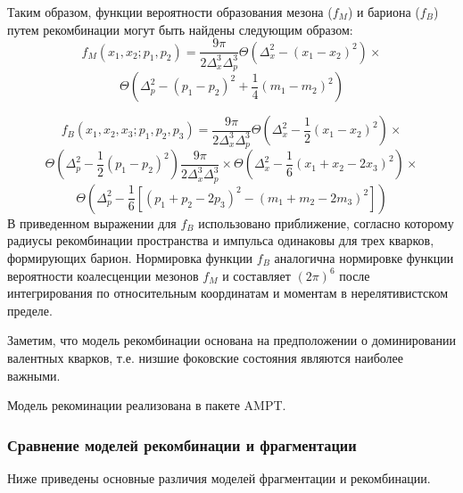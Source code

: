 Таким образом, функции вероятности образования мезона ($f_M$) и бариона ($f_B$) путем рекомбинации могут быть найдены следующим образом:
$$f_M (x_1,x_2;p_1,p_2 )=\frac{9 \pi}{2\Delta_{x}^3 \Delta_{p}^3} \Theta \left( \Delta_{x}^2 - (x_1 - x_2)^2  \right) \times$$
$$ \Theta \left( \Delta_{p}^2 - (p_1 - p_2)^2  + \frac{1}{4}(m_1 - m_2)^2 \right) $$


$$f_B(x_1, x_2, x_3; p_1, p_2, p_3) = \frac{9 \pi}{2\Delta_{x}^3 \Delta_{p}^3} 
\Theta \left( \Delta_{x}^2 - \frac{1}{2} (x_1 - x_2)^2\right) \times $$
$$\Theta \left( \Delta_{p}^2 - \frac{1}{2} (p_1 - p_2)^2\right) \frac{9 \pi}{2\Delta_{x}^3 \Delta_{p}^3}\times
\Theta \left( \Delta_{x}^2 - \frac{1}{6} (x_1 + x_2 - 2 x_3)^2\right) \times $$
$$\Theta \left( \Delta_{p}^2 - \frac{1}{6} \left[ (p_1 + p_2 - 2 p_3)^2 - (m_1 + m_2 -2 m_3)^2 \right] \right) $$
В приведенном выражении для $f_B$ использовано приближение, согласно которому радиусы рекомбинации пространства и импульса одинаковы для трех кварков, формирующих барион. Нормировка функции $f_B$ аналогична нормировке функции вероятности коалесценции мезонов $f_M$ и составляет $(2\pi)^6$ после интегрирования по относительным координатам и моментам в нерелятивистском пределе. 

Заметим, что модель рекомбинации основана на предположении о доминировании валентных кварков, т.е. низшие фоковские состояния являются наиболее важными. 

Модель рекоминации реализована в пакете AMPT.


\subsubsection{Сравнение моделей рекомбинации и фрагментации}
Ниже приведены основные различия моделей фрагментации и рекомбинации.

